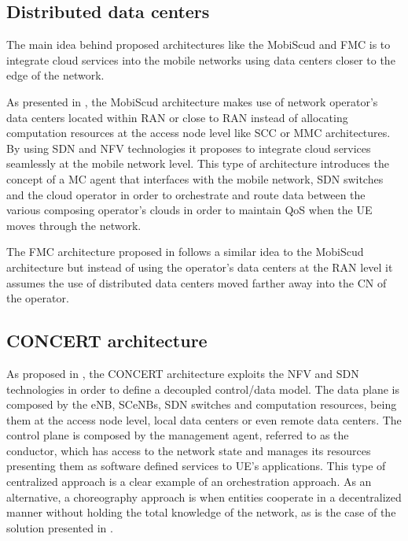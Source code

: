 \subsection{Distributed data centers}
\noindent The main idea behind proposed architectures like the \acrfull{MobiScud} \cite{MobiScud} and \acrfull{FMC} \cite{fmcloud} is to integrate cloud services into the mobile networks using data centers closer to the edge of the network.

As presented in \cite{MobiScud}, the \acrfull{MobiScud} architecture makes use of network operator's data centers located within \acrshort{RAN} or close to \acrshort{RAN} instead of allocating computation resources at the access node level like \acrshort{SCC} or \acrshort{MMC} architectures. By using \acrfull{SDN} and \acrfull{NFV} technologies it proposes to integrate cloud services seamlessly at the mobile network level. This type of architecture introduces the concept of a \acrfull{MC} agent that interfaces with the mobile network, \acrshort{SDN} switches and the cloud operator in order to orchestrate and route data between the various composing operator's clouds in order to maintain \acrshort{QoS} when the \acrshort{UE} moves through the network.

The \acrfull{FMC} architecture proposed in \cite{fmcloud} follows a similar idea to the \acrshort{MobiScud} architecture but instead of using the operator's data centers at the RAN level it assumes the use of distributed data centers moved farther away into the \acrfull{CN} of the operator.

\subsection{CONCERT architecture}
\noindent As proposed in \cite{CONCERT}, the CONCERT architecture exploits the \acrshort{NFV} and \acrshort{SDN} technologies in order to define a decoupled control/data model.
The data plane is composed by the \acrshort{eNB}, \acrshort{SCeNBs}, \acrshort{SDN} switches and computation resources, being them at the access node level, local data centers or even remote data centers.
The control plane is composed by the management agent, referred to as the conductor, which has access to the network state and manages its resources presenting them as software defined services to \acrshort{UE}'s applications. This type of centralized approach is a clear example of an orchestration approach. As an alternative, a choreography approach is when entities cooperate in a decentralized manner without holding the total knowledge of the network, as is the case of the solution presented in \cite{fogmulti}.

